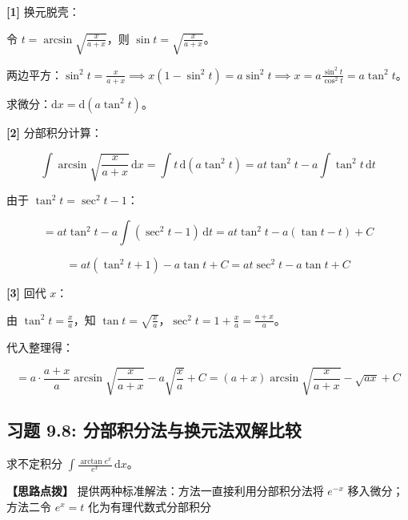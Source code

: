 \documentclass[11pt,a4paper,UTF8]{ctexart}
\begin{document}
\begin{solbox}[分步推导与答题规范]
\textbf{[1]} 换元脱壳：

令 $t = \arcsin\sqrt{\frac{x}{a+x}}$，则 $\sin t = \sqrt{\frac{x}{a+x}}$。

两边平方：$\sin^2 t = \frac{x}{a+x} \implies x(1-\sin^2 t) = a\sin^2 t \implies x = a\frac{\sin^2 t}{\cos^2 t} = a\tan^2 t$。

求微分：$\mathrm{d}x = \mathrm{d}(a\tan^2 t)$。

\textbf{[2]} 分部积分计算：


\begin{equation*}
\int \arcsin\sqrt{\frac{x}{a+x}}\,\mathrm{d}x = \int t\,\mathrm{d}(a\tan^2 t) = a t \tan^2 t - a\int \tan^2 t\,\mathrm{d}t
\end{equation*}


由于 $\tan^2 t = \sec^2 t - 1$：


\begin{equation*}
= a t \tan^2 t - a\int (\sec^2 t - 1)\,\mathrm{d}t = a t \tan^2 t - a(\tan t - t) + C
\end{equation*}



\begin{equation*}
= a t(\tan^2 t + 1) - a\tan t + C = a t \sec^2 t - a\tan t + C
\end{equation*}


\textbf{[3]} 回代 $x$：

由 $\tan^2 t = \frac{x}{a}$，知 $\tan t = \sqrt{\frac{x}{a}}$，$\sec^2 t = 1 + \frac{x}{a} = \frac{a+x}{a}$。

代入整理得：


\begin{equation*}
= a \cdot \frac{a+x}{a} \arcsin\sqrt{\frac{x}{a+x}} - a\sqrt{\frac{x}{a}} + C = (a+x)\arcsin\sqrt{\frac{x}{a+x}} - \sqrt{ax} + C
\end{equation*}

\end{solbox}


\subsection{习题 9.8: 分部积分法与换元法双解比较}

求不定积分 $\int \frac{\arctan e^x}{e^x}\,\mathrm{d}x$。

\textbf{\color{DeepPurple}【思路点拨】} 提供两种标准解法：方法一直接利用分部积分法将 $e^{-x}$ 移入微分；方法二令 $e^x = t$ 化为有理代数式分部积分
\end{document}

